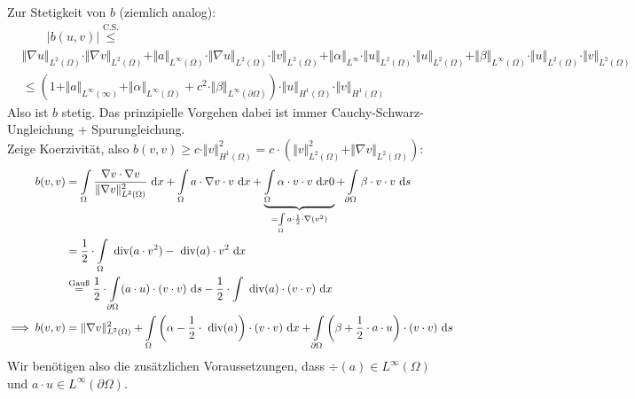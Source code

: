 \documentclass[12pt,a4paper]{article}
\begin{document}
\begin{lösung}
Zur Stetigkeit von $b$ (ziemlich analog):
\begin{align*}
&\qquad\big| b(u,v)\big|\stackrel{\text{C.S.}}{\leq}\\
&\Vert\nabla u\Vert_{L^2(\Omega)}\cdot\Vert\nabla v\Vert_{L^2(\Omega)}+\Vert a\Vert_{L^\infty(\Omega)}\cdot\Vert\nabla u\Vert_{L^2(\Omega)}\cdot\Vert v\Vert_{L^2(\Omega)}
+\Vert\alpha\Vert_{L^\infty}\cdot\Vert u\Vert_{L^2(\Omega)}\cdot\Vert u\Vert_{L^2(\Omega)}+\Vert\beta\Vert_{L^\infty(\Omega)}\cdot\Vert u\Vert_{L^2(\Omega)}\cdot\Vert v\Vert_{L^2(\Omega)}\\
&\leq
\left(1+\Vert a\Vert_{L^\infty(\infty)}+\Vert\alpha\Vert_{L^\infty(\Omega)}+c^2\cdot\Vert\beta\Vert_{L^\infty(\partial\Omega)}\right)\cdot\Vert u\Vert_{H^1(\Omega)}\cdot\Vert v\Vert_{H^1(\Omega)}
\end{align*}
 Also ist $b$ stetig. Das prinzipielle Vorgehen dabei ist immer Cauchy-Schwarz-Ungleichung + Spurungleichung.\\
 
Zeige Koerzivität, also $b(v,v)\geq c\cdot\Vert v\Vert^2_{H^1(\Omega)}=c\cdot\left(\Vert v\Vert^2_{L^2(\Omega)}+\Vert \nabla v\Vert_{L^2(\Omega)}\right)$:
\begin{align*}
b(v,v)&=\int\limits_\Omega\frac{\nabla v\cdot\nabla v}{\Vert \nabla v\Vert^2_{L^2(\Omega)}}\text{ d} x+\int\limits_\Omega a\cdot\nabla v\cdot v\text{ d} x+\underbrace{\int\limits_\Omega\alpha\cdot v\cdot v\text{ d} x 0}_{=\int\limits_\Omega a\cdot\frac{1}{2}\cdot\nabla(v^2)}+\int\limits_{\partial\Omega}\beta\cdot v\cdot v\text{ d} s\\
&=\frac{1}{2}\cdot\int\limits_\Omega\text{ div}(a\cdot v^2)-\text{ div}(a)\cdot v^2\text{ d} x\\
&\stackrel{\text{Gauß}}{=}
\frac{1}{2}\cdot\int\limits_{\partial\Omega}(a\cdot u)\cdot(v\cdot v)\text{ d} s-\frac{1}{2}\cdot\int\limits\text{ div}(a)\cdot(v\cdot v)\text{ d} x\\
\implies
b(v,v)&=\Vert\nabla v\Vert^2_{L^2(\Omega)}+\int\limits_\Omega\left(\alpha-\frac{1}{2}\cdot\text{ div}(a)\right)\cdot(v\cdot v)\text{ d} x
+\int\limits_{\partial\Omega}\left(\beta+\frac{1}{2}\cdot a\cdot u\right)\cdot(v\cdot v)\text{ d} s
\end{align*}
Wir benötigen also die zusätzlichen Voraussetzungen, dass $\div(a)\in L^\infty(\Omega)$ und $a\cdot u\in L^\infty(\partial\Omega)$.\\


\end{lösung}
\end{document}
